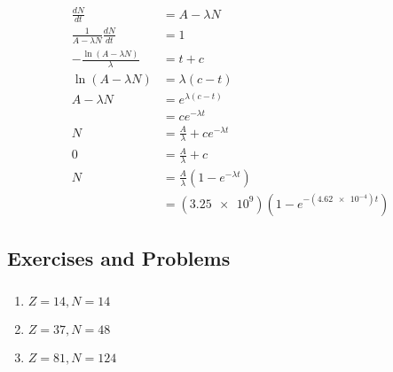 \documentclass{article}
\begin{document}
\begin{enumerate}
        \begin{align*}
          \frac{d N}{d t}                         & = A - \lambda N                               \\
          \frac{1}{A - \lambda N} \frac{d N}{d t} & = 1                                           \\
          -\frac{\ln (A - \lambda N)}{\lambda}    & = t + c                                       \\
          \ln (A - \lambda N)                     & = \lambda (c - t)                             \\
          A - \lambda N                           & = e^{\lambda (c - t)}                         \\
                                                  & = c e^{-\lambda t}                            \\
          N                                       & = \frac{A}{\lambda} + c e^{-\lambda t}        \\
          0                                       & = \frac{A}{\lambda} + c                       \\
          N                                       & = \frac{A}{\lambda} (1 - e^{-\lambda t})      \\
                                                  & = (\num{3.25e9}) (1 - e^{-(\num{4.62e-4}) t})
        \end{align*}
\end{enumerate}

\subsection{Exercises and Problems}

\subsubsection{}

\begin{enumerate}
  \item $Z = 14, N = 14$

  \item $Z = 37, N = 48$

  \item $Z = 81, N = 124$
\end{enumerate}

\setcounter{subsubsection}{2}
\subsubsection{}
\end{document}
